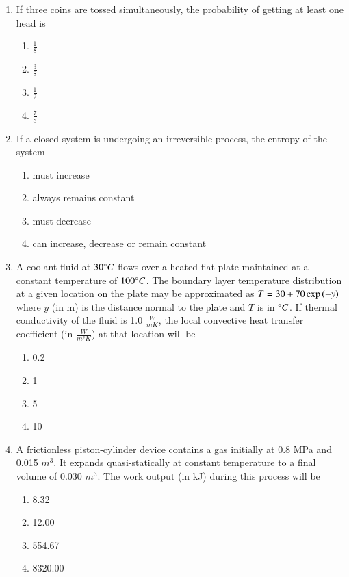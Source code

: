 \documentclass[journal]{IEEEtran}
\begin{document}
\begin{enumerate}
    \item If three coins are tossed simultaneously, the probability of getting at
    least one head is
    \begin{multicols}{4}
    \begin{enumerate}
        \item $\frac{1}{8}$
        \item $\frac{3}{8}$
        \item $\frac{1}{2}$
        \item $\frac{7}{8}$
    \end{enumerate}
    \end{multicols}

    \item If a closed system is undergoing an irreversible process, the entropy
    of the system
    \begin{enumerate}
        \item must increase
        \item always remains constant
        \item must decrease
        \item can increase, decrease or remain constant
    \end{enumerate}

    \item A coolant fluid at $30 \degree C$ flows over a heated flat plate
    maintained at a constant temperature of $100 \degree C$. The boundary
    layer temperature distribution at a given location on the plate may be
    approximated as $T = 30 + 70\exp\left(-y\right)$ where $y$ (in m) is the
    distance normal to the plate and $T$ is in $\degree C$. If thermal
    conductivity of the fluid is 1.0 $\frac{W}{mK}$, the local convective heat
    transfer coefficient (in $\frac{W}{m^2K}$) at that location will be
    \begin{multicols}{4}
    \begin{enumerate}
        \item 0.2
        \item 1
        \item 5
        \item 10
    \end{enumerate}
    \end{multicols}

    \item A frictionless piston-cylinder device contains a gas initially at
    0.8 MPa and 0.015 $m^3$. It expands quasi-statically at constant
    temperature to a final volume of 0.030 $m^3$. The work output (in kJ)
    during this process will be
    \begin{multicols}{4}
    \begin{enumerate}
        \item 8.32
        \item 12.00
        \item 554.67
        \item 8320.00
    \end{enumerate}
    \end{multicols}


\end{enumerate}
\end{document}

